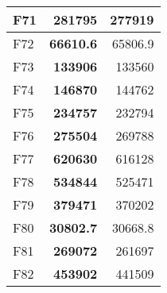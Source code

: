 \begin{table}[]
\begin{tabular}{lrr|}
\multicolumn{1}{|l|}{\cellcolor[HTML]{FCE6AB}F71} & \multicolumn{1}{r|}{\cellcolor[HTML]{D3FFB6}\textbf{281795}}  & 277919                                                    \\ \hline
\multicolumn{1}{|l|}{\cellcolor[HTML]{FCE6AB}F72} & \multicolumn{1}{r|}{\cellcolor[HTML]{D3FFB6}\textbf{66610.6}} & 65806.9                                                   \\ \hline
\multicolumn{1}{|l|}{\cellcolor[HTML]{FCE6AB}F73} & \multicolumn{1}{r|}{\cellcolor[HTML]{D3FFB6}\textbf{133906}}  & 133560                                                    \\ \hline
\multicolumn{1}{|l|}{\cellcolor[HTML]{FCE6AB}F74} & \multicolumn{1}{r|}{\cellcolor[HTML]{D3FFB6}\textbf{146870}}  & 144762                                                    \\ \hline
\multicolumn{1}{|l|}{\cellcolor[HTML]{FCE6AB}F75} & \multicolumn{1}{r|}{\cellcolor[HTML]{D3FFB6}\textbf{234757}}  & 232794                                                    \\ \hline
\multicolumn{1}{|l|}{\cellcolor[HTML]{FCE6AB}F76} & \multicolumn{1}{r|}{\cellcolor[HTML]{D3FFB6}\textbf{275504}}  & 269788                                                    \\ \hline
\multicolumn{1}{|l|}{\cellcolor[HTML]{FCE6AB}F77} & \multicolumn{1}{r|}{\cellcolor[HTML]{D3FFB6}\textbf{620630}}  & 616128                                                    \\ \hline
\multicolumn{1}{|l|}{\cellcolor[HTML]{FCE6AB}F78} & \multicolumn{1}{r|}{\cellcolor[HTML]{D3FFB6}\textbf{534844}}  & 525471                                                    \\ \hline
\multicolumn{1}{|l|}{\cellcolor[HTML]{FCE6AB}F79} & \multicolumn{1}{r|}{\cellcolor[HTML]{D3FFB6}\textbf{379471}}  & 370202                                                    \\ \hline
\multicolumn{1}{|l|}{\cellcolor[HTML]{FCE6AB}F80} & \multicolumn{1}{r|}{\cellcolor[HTML]{D3FFB6}\textbf{30802.7}} & 30668.8                                                   \\ \hline
\multicolumn{1}{|l|}{\cellcolor[HTML]{FCE6AB}F81} & \multicolumn{1}{r|}{\cellcolor[HTML]{D3FFB6}\textbf{269072}}  & 261697                                                    \\ \hline
\multicolumn{1}{|l|}{\cellcolor[HTML]{FCE6AB}F82} & \multicolumn{1}{r|}{\cellcolor[HTML]{D3FFB6}\textbf{453902}}  & 441509                                                    \\ \hline

\end{tabular}
\end{table}
